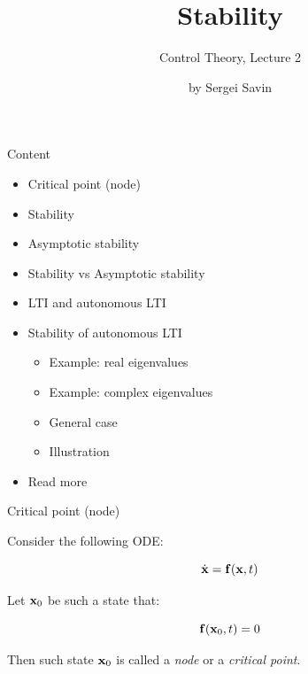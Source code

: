 \documentclass{beamer}
\title{Stability}
\subtitle{Control Theory, Lecture 2}
\author{by Sergei Savin}
\date{\mydate}
\begin{document}
\maketitle


\begin{frame}{Content}

\begin{itemize}
\item Critical point (node)
\item Stability
\item Asymptotic stability
\item Stability vs Asymptotic stability
\item LTI and autonomous LTI
\item Stability of autonomous LTI
    \begin{itemize}
    \item Example: real eigenvalues
    \item Example: complex eigenvalues
    \item General case
    \item Illustration
    \end{itemize}
\item Read more
\end{itemize}

\end{frame}



\begin{frame}{Critical point (node)}
\begin{flushleft}

Consider the following ODE:

\begin{equation}
    \dot{\mathbf{x}} = \mathbf{f} (\mathbf{x}, t)
\end{equation}

Let $\mathbf{x}_0$ be such a state that:

\begin{equation}
    \mathbf{f} (\mathbf{x}_0, t) = 0
\end{equation}

Then such state $\mathbf{x}_0$ is called a \emph{node} or a \emph{critical point}.

\end{flushleft}
\end{frame}
\end{document}
